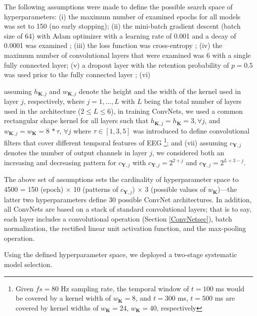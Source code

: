\documentclass{ieeeaccess}
\begin{document}
    The following assumptions were made to define the possible search space of hyperparameters: (i) the maximum number of examined epochs for all models was set to 150 (no early stopping); (ii) the mini-batch gradient descent (batch size of 64) with Adam optimizer with a learning rate of 0.001 and a decay of 0.0001  was examined \cite{KingmaB14}; (iii) the loss function was cross-entropy \cite{Goodfellow}; (iv) the maximum number of convolutional layers that were examined was 6 with a single fully connected layer; (v) a dropout layer with the retention probability of $p = 0.5$ was used prior to the fully connected layer \cite{Srivastava:2014};
    (vi)  {assuming $h_{\mathbf{K}, j}$ and $w_{\mathbf{K}, j}$ denote the height and the width of the kernel used in layer $j$, respectively, where $j=1,...,L$ with $L$ being the total number of layers used in the architecture ($2\leq L \leq 6$), in training ConvNets, we used a common rectangular shape kernel for all layers such that $h_{\mathbf{K}, j}=h_{\mathbf{K}}= 3, \forall j$, and $w_{\mathbf{K}, j} = w_{\mathbf{K}} = 8 \,*\tau$, $\forall j$ where $\tau \in [1, 3, 5]$ was introduced to define convolutional filters that cover different temporal features of EEG \footnote{Given $fs = 80$ Hz sampling rate, the temporal window of $t = 100$ ms would be covered by a kernel width of $w_{\mathbf{K}} = 8$, and $t = 300$ ms, $t = 500$ ms are covered by kernel widths of $w_{\mathbf{K}} = 24$, $w_{\mathbf{K}} = 40$, respectively};  and (vii) assuming $c_{\mathbf{Y}, j}$ denotes the number of output channels in layer $j$, we considered both an increasing and decreasing pattern for $c_{\mathbf{Y}, j}$ with $c_{\mathbf{Y}, j}=2^{2+j}$ and $c_{\mathbf{Y}, j}=2^{L+3-j}$. 
    
The above set of assumptions sets the cardinality of hyperparameter space to 4500 = 150 (epoch) $\times$ 10 (patterns of $c_{\mathbf{Y}, j}$) $\times$ 3 (possible values of $w_{\mathbf{K}}$)---the latter two hyperparameters define 30 possible ConvNet architectures. In addition, all ConvNets are based on a stack of standard convolutional layers; that is to say, each layer includes a convolutional operation (Section \ref{ConvNetsec}),  batch normalization,  the rectified linear unit activation function,  and the max-pooling operation.  {Using the defined hyperparameter space, we deployed a two-stage systematic model selection. 
    
}}
\end{document}
